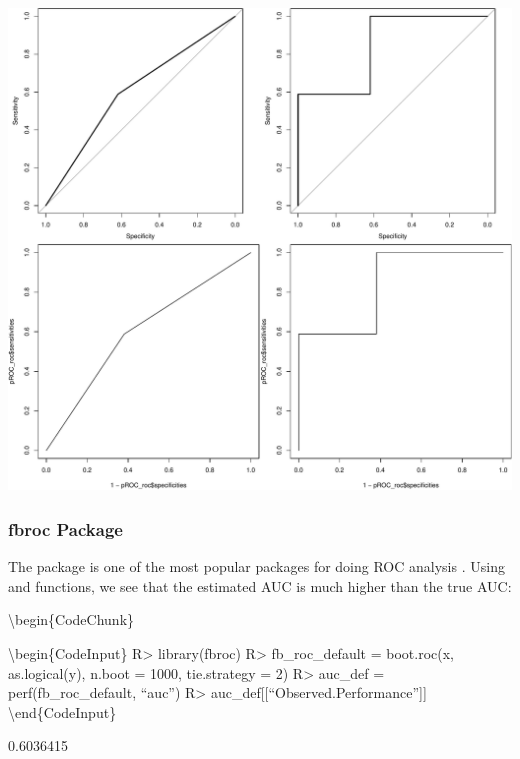 \documentclass[article]{jss}
\begin{document}
\begin{CodeChunk}


\begin{center}\includegraphics{index_files/figure-latex/unnamed-chunk-14-1} \end{center}

\end{CodeChunk}

\hypertarget{fbroc-package}{%
\subsubsection{fbroc Package}\label{fbroc-package}}

The  package is one of the most popular packages for doing
ROC analysis \citep{fbroc}. Using  and
 functions, we see that the estimated AUC is much
higher than the true AUC:

\textbackslash{}begin\{CodeChunk\}

\textbackslash{}begin\{CodeInput\} R\textgreater{} library(fbroc)
R\textgreater{} fb\_roc\_default = boot.roc(x, as.logical(y), n.boot =
1000, tie.strategy = 2) R\textgreater{} auc\_def =
perf(fb\_roc\_default, ``auc'') R\textgreater{}
auc\_def{[}{[}``Observed.Performance''{]}{]}
\textbackslash{}end\{CodeInput\}

\begin{CodeOutput}
[1] 0.6036415
\end{CodeOutput}
\end{document}
